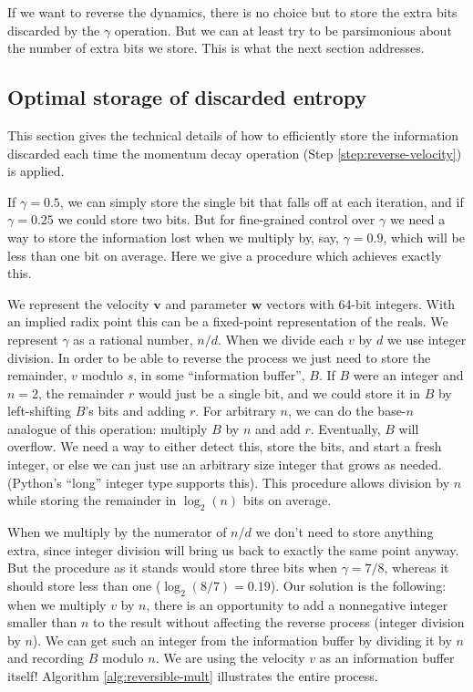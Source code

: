 \documentclass{article}
\newcommand{\vw}{\mathbf{w}}
\newcommand{\vv}{\mathbf{v}}
\newcommand{\params}{\vw}
\newcommand{\decay}{\gamma}
\begin{document}
If we want to reverse the dynamics, there is no choice but to store the extra
bits discarded by the $\decay$ operation. But we can at least try to
be parsimonious about the number of extra bits we store. This is what the next
section addresses.

\subsection{Optimal storage of discarded entropy}
\label{sec:reversible computation}

This section gives the technical details of how to efficiently store the information discarded each time the momentum decay
operation (Step \ref{step:reverse-velocity}) is applied.

If $\decay = 0.5$, we can simply store the
single bit that falls off at each iteration, and if $\decay = 0.25$ we could
store two bits. But for fine-grained control over $\decay$ we need a way to store the information lost when we multiply by, say, $\decay = 0.9$, which will be less than one bit on average. Here we give a procedure which achieves exactly
this.

We represent the velocity $\vv$ and parameter $\params$ vectors with 64-bit integers. With an implied radix point this can be a fixed-point
representation of the reals. We represent $\decay$ as a rational number,
$n/d$. When we divide each $v$ by $d$ we use integer division. In order to be able to
reverse the process we just need to store the remainder, $v$ modulo $s$, in some
``information buffer'', $B$. If $B$ were an integer and $n = 2$, the remainder $r$ would just be a single bit, and we could store it in $B$ by left-shifting $B$'s bits and adding $r$. For arbitrary $n$, we can do the base-$n$ analogue of this operation: multiply $B$ by $n$ and add $r$.
Eventually, $B$ will overflow. We need a way to either detect
this, store the bits, and start a fresh integer, or else we can just use an
arbitrary size integer that grows as needed. (Python's ``long'' integer type
supports this). This procedure allows division by $n$ while storing the
remainder in $\log_2(n)$ bits on average.

When we multiply by the numerator of $n/d$ we don't need to store anything
extra, since integer division will bring us back to exactly the same point
anyway. But the procedure as it stands would store three bits when $\decay = 7/8$,
whereas it should store less than one ($\log_2 (8/7) = 0.19$). Our solution is the following: when we multiply $v$ by $n$, there is an opportunity to add a
nonnegative integer smaller than $n$ to the result without affecting the reverse
process (integer division by $n$). We can get such an integer from the
information buffer by dividing it by $n$ and recording $B$ modulo $n$. We are using
the velocity $v$ as an information buffer itself! Algorithm
\ref{alg:reversible-mult} illustrates the entire process.
\end{document}
